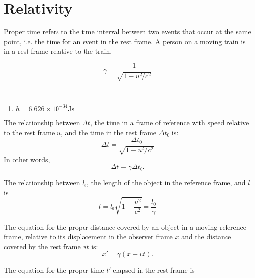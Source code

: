 \documentclass[nobib,notoc]{tufte-handout}
\begin{document}
\section{Relativity}
\begin{defi}
	Proper time refers to the time interval between two events that occur at the same point, i.e. the time for an event in the rest frame. A person on a moving train is in a rest frame relative to the train.
\end{defi}
\begin{defi}
	\begin{equation*}
		\gamma=\frac{1}{\sqrt{1-u^2/c^2}}
	\end{equation*}
\end{defi}
\begin{defi}[Constants]
	\,
	\begin{enumerate}
		\item \(h=6.626\times 10^{-34}\text{Js}\)
	\end{enumerate}
\end{defi}
\begin{defi}
	The relationship between \(\Delta t\), the time in a frame of reference with speed relative to the rest frame \(u\), and the time in the rest frame \(\Delta t_0\) is:
	\begin{equation*}
		\Delta t=\frac{\Delta t_0}{\sqrt{1-u^2/c^2}}
	\end{equation*}
	In other words,
	\begin{equation*}
		\Delta t=\gamma\Delta t_0.
	\end{equation*}
\end{defi}
\begin{defi}
	The relationship between \(l_0\), the length of the object in the reference frame, and \(l\) is
	\begin{equation*}
		l=l_0\sqrt{1-\frac{u^2}{c^2}}=\frac{l_0}{\gamma}
	\end{equation*}
\end{defi}
\begin{defi}
	The equation for the proper distance covered by an object in a moving reference frame, relative to its displacement in the observer frame \(x\) and the distance covered by the rest frame \(ut\) is:
	\begin{equation*}
		x'=\gamma(x-ut).
	\end{equation*}
\end{defi}
	The equation for the proper time \(t'\) elapsed in the rest frame is
\end{document}
